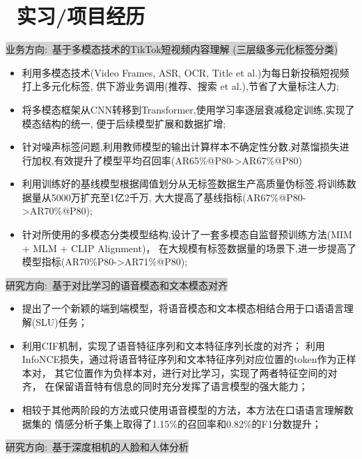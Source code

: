 \documentclass{resume}
\begin{document}
\section{\faUsers\ 实习/项目经历}
\colorbox{lightgray}{业务方向:\ 基于多模态技术的TikTok短视频内容理解 (三层级多元化标签分类)}
\begin{itemize}[parsep=1.0ex]
  \item 利用多模态技术(Video Frames, ASR, OCR, Title et al.)为每日新投稿短视频打上多元化标签,
  供下游业务调用(推荐、搜索 et al.),节省了大量标注人力;
  \item 将多模态框架从CNN转移到Transformer,使用学习率逐层衰减稳定训练,实现了模态结构的统一,
  便于后续模型扩展和数据扩增;
  \item 针对噪声标签问题,利用教师模型的输出计算样本不确定性分数,对蒸馏损失进行加权,有效提升了模型平均召回率(AR65\%@P80->AR67\%@P80)
  \item 利用训练好的基线模型根据阈值划分从无标签数据生产高质量伪标签,将训练数据量从5000万扩充至1亿2千万,
  大大提高了基线指标(AR67\%@P80->AR70\%@P80);
  \item 针对所使用的多模态分类模型结构,设计了一套多模态自监督预训练方法(MIM + MLM + CLIP Alignment)，
  在大规模有标签数据量的场景下,进一步提高了模型指标(AR70\%P80->AR71\%@P80);
\end{itemize}
\colorbox{lightgray}{研究方向:\ 基于对比学习的语音模态和文本模态对齐}
\href{https://arxiv.org/abs/2204.10461}{\textcolor{linkcolor}{\faExternalLink}}
\begin{itemize}[parsep=1.0ex]
  \item 提出了一个新颖的端到端模型，将语音模态和文本模态相结合用于口语语言理解(SLU)任务；
  \item 利用CIF机制，实现了语音特征序列和文本特征序列长度的对齐；
        利用InfoNCE损失，通过将语音特征序列和文本特征序列对应位置的token作为正样本对，
        其它位置作为负样本对，进行对比学习，实现了两者特征空间的对齐，
        在保留语音特有信息的同时充分发挥了语言模型的强大能力；
  \item 相较于其他两阶段的方法或只使用语音模型的方法，本方法在口语语言理解数据集的
        情感分析子集上取得了1.15\%的召回率和0.82\%的F1分数提升；
\end{itemize}
\colorbox{lightgray}{研究方向:\ 基于深度相机的人脸和人体分析}
\end{document}
